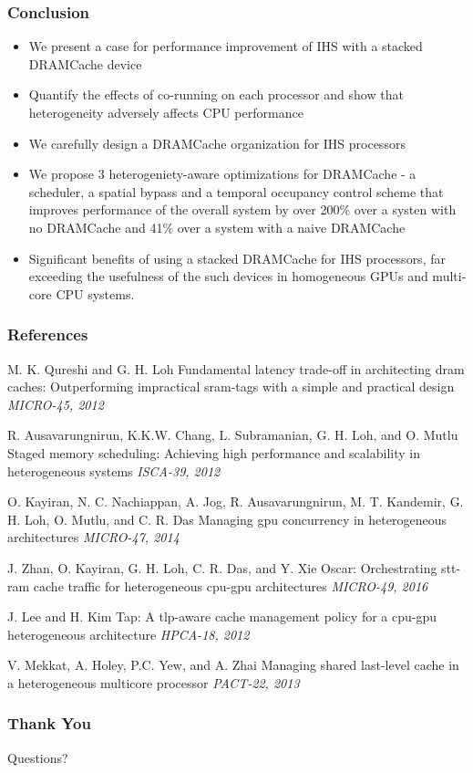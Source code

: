 \documentclass{beamer}
\begin{document}
\begin{frame}[fragile] %
\frametitle{Conclusion}
\begin{itemize}
	\item We present a case for performance improvement of IHS with a stacked DRAMCache device
	\item Quantify the effects of co-running on each processor and show that heterogeneity adversely affects CPU performance 
	\item We carefully design a DRAMCache organization for IHS processors
	\item We propose 3 heterogeniety-aware optimizations for DRAMCache - a scheduler, a spatial bypass and a temporal occupancy control scheme that improves performance of the overall system by over 200\% over a systen with no DRAMCache and 41\% over a system with a naive DRAMCache
	\item Significant benefits of using a stacked DRAMCache for IHS processors, far exceeding the usefulness of the such devices in homogeneous GPUs and multi-core CPU systems.
\end{itemize}
\end{frame}


\begin{frame}
\frametitle{References}
\scriptsize{
\begin{thebibliography}{99} %
 M. K. Qureshi and G. H. Loh
\newblock Fundamental latency trade-off in architecting dram caches: Outperforming impractical sram-tags with a simple and practical design
\newblock \emph{MICRO-45, 2012}


 R. Ausavarungnirun, K.K.W. Chang, L. Subramanian, G. H. Loh, and O. Mutlu
\newblock Staged memory scheduling: Achieving high performance and scalability in heterogeneous systems
\newblock \emph{ISCA-39, 2012}

 O. Kayiran, N. C. Nachiappan, A. Jog, R. Ausavarungnirun, M. T. Kandemir, G. H. Loh, O. Mutlu, and C. R. Das
\newblock Managing gpu concurrency in heterogeneous architectures
\newblock \emph{MICRO-47, 2014}

 J. Zhan, O. Kayiran, G. H. Loh, C. R. Das, and Y. Xie
\newblock Oscar: Orchestrating stt-ram cache traffic for heterogeneous cpu-gpu architectures
\newblock \emph{MICRO-49, 2016}

 J. Lee and H. Kim
\newblock Tap: A tlp-aware cache management policy for a cpu-gpu heterogeneous architecture
\newblock \emph{HPCA-18, 2012}

 V. Mekkat, A. Holey, P.C. Yew, and A. Zhai
\newblock Managing shared last-level cache in a heterogeneous multicore processor
\newblock \emph{PACT-22, 2013}

\end{thebibliography}
}
\end{frame}


\begin{frame}
\frametitle{Thank You}
\Huge{\centerline{Questions? }}
\end{frame}

\end{document}
